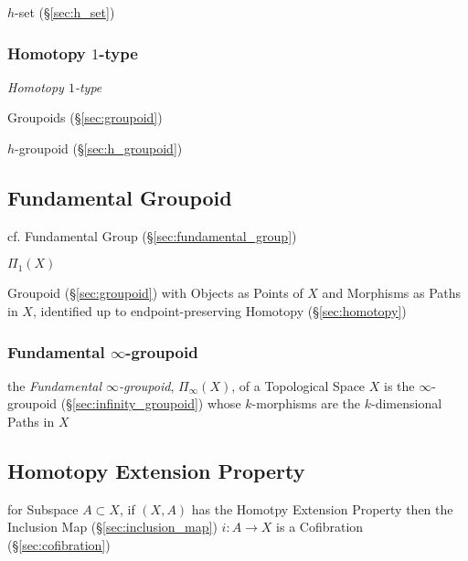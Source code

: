 $h$-set (\S\ref{sec:h_set})



\subsubsection{Homotopy $1$-type}\label{sec:homotopy_1type}

\emph{Homotopy $1$-type}

Groupoids (\S\ref{sec:groupoid})

$h$-groupoid (\S\ref{sec:h_groupoid})



\subsection{Fundamental Groupoid}\label{sec:fundamental_groupoid}

cf. Fundamental Group (\S\ref{sec:fundamental_group})

$\Pi_1(X)$

Groupoid (\S\ref{sec:groupoid}) with Objects as Points of $X$ and Morphisms as
Paths in $X$, identified up to endpoint-preserving Homotopy
(\S\ref{sec:homotopy})



\subsubsection{Fundamental $\infty$-groupoid}
\label{sec:fundamental_infinity_groupoid}


the \emph{Fundamental $\infty$-groupoid}, $\Pi_\infty(X)$, of a Topological
Space $X$ is the $\infty$-groupoid (\S\ref{sec:infinity_groupoid}) whose
$k$-morphisms are the $k$-dimensional Paths in $X$



\subsection{Homotopy Extension Property}\label{sec:homotopy_extension}

for Subspace $A \subset X$, if $(X,A)$ has the Homotpy Extension
Property then the Inclusion Map (\S\ref{sec:inclusion_map}) $i : A
\rightarrow X$ is a Cofibration (\S\ref{sec:cofibration})



